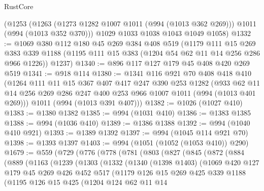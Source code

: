 \begin{lexlean}{RustCore}
\begin{coremodule}
    (@1253
      (@1263 (@1273 @1282 @1007 @1011 (@994 (@1013 @362 @269))) @1011 (@994 (@1013 @352 @370)))
      @1029
      @1033
      @1038
      @1043
      @1049
      @1058)
@1332 := @1069
    @380
    @112
    @180
    @45
    @269
    @384
    @408
    @519
    (@1179
      @111
      @15
      @269
      @383
      @339
      @1188
      (@1195 @111 @15 @383 (@1204 @54 @62 @11 @14 @256 @286 @966 @1226))
      @1237)
@1340 := @896 @117 @127 @179 @45 @408 @420 @269 @519
@1341 := @918 @114
@1380 := @1341
    @116
    @921
    @70
    @408
    @418
    @410
    (@1264
      @111
      @11
      @15
      @367
      @407
      @417
      @247
      @390
      @253
      @1282
      (@933 @62 @11 @14 @256 @269 @286 @247 @400 @253 @966 @1007 @1011 (@994 (@1013 @401 @269)))
      @1011
      (@994 (@1013 @391 @407)))
@1382 := @1026 (@1027 @410)
@1383 := @1380 @1382
@1385 := @994 (@1031 @410)
@1386 := @1383 @1385
@1388 := @994 (@1036 @410)
@1389 := @1386 @1388
@1392 := @994 (@1040 @410 @921)
@1393 := @1389 @1392
@1397 := @994 (@1045 @114 @921 @70)
@1398 := @1393 @1397
@1403 := @994 (@1051 (@1052 (@1053 @410)) @290)
@1679 := @559
    (@729
      (@776
        (@778
          (@781
            (@803
              (@827
                (@845
                  (@872
                    (@884
                      (@889
                        (@1163
                          (@1239
                            (@1303
                              (@1332
                                (@1340
                                  (@1398 @1403)
                                  (@1069
                                    @420
                                    @127
                                    @179
                                    @45
                                    @269
                                    @426
                                    @452
                                    @517
                                    (@1179
                                      @126
                                      @15
                                      @269
                                      @425
                                      @339
                                      @1188
                                      (@1195
                                        @126
                                        @15
                                        @425
                                        (@1204
                                          @124
                                          @62
                                          @11
                                          @14

\end{coremodule}
\end{lexlean}

